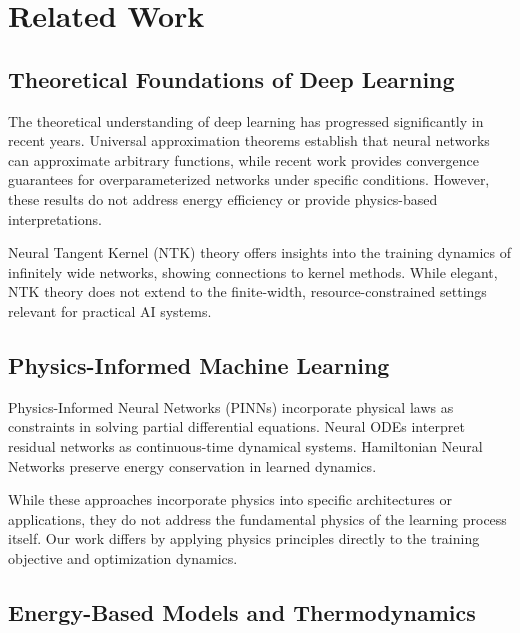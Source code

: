 \documentclass[12pt]{article}
\begin{document}
\section{Related Work}

\subsection{Theoretical Foundations of Deep Learning}

The theoretical understanding of deep learning has progressed significantly in recent years. Universal approximation theorems \cite{cybenko1989approximation,hornik1989multilayer} establish that neural networks can approximate arbitrary functions, while recent work \cite{allen2019convergence,du2019gradient} provides convergence guarantees for overparameterized networks under specific conditions. However, these results do not address energy efficiency or provide physics-based interpretations.

Neural Tangent Kernel (NTK) theory \cite{jacot2018neural} offers insights into the training dynamics of infinitely wide networks, showing connections to kernel methods. While elegant, NTK theory does not extend to the finite-width, resource-constrained settings relevant for practical AI systems.

\subsection{Physics-Informed Machine Learning}

Physics-Informed Neural Networks (PINNs) \cite{raissi2019physics,karniadakis2021physics} incorporate physical laws as constraints in solving partial differential equations. Neural ODEs \cite{chen2018neural} interpret residual networks as continuous-time dynamical systems. Hamiltonian Neural Networks \cite{greydanus2019hamiltonian,finzi2020simplifying} preserve energy conservation in learned dynamics.

While these approaches incorporate physics into specific architectures or applications, they do not address the fundamental physics of the learning process itself. Our work differs by applying physics principles directly to the training objective and optimization dynamics.

\subsection{Energy-Based Models and Thermodynamics}
\end{document}
